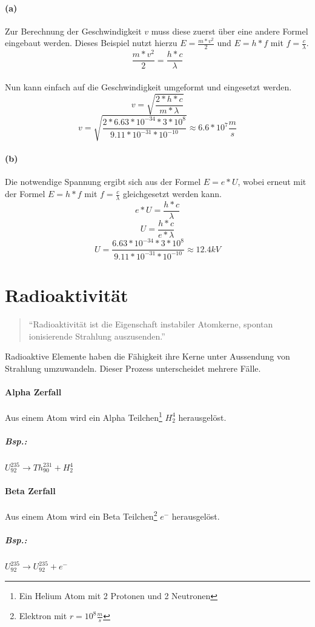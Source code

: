 \documentclass{school}
\begin{document}
\paragraph{(a)}
Zur Berechnung der Geschwindigkeit $v$ muss diese zuerst über eine andere Formel eingebaut werden. Dieses Beispiel nutzt hierzu $E = \frac{m*v^2}{2}$ und $E = h * f$ mit $f = \frac{c}{\lambda}$.
$$\frac{m*v^2}{2} = \frac{h * c}{\lambda}$$
~\\
Nun kann einfach auf die Geschwindigkeit umgeformt und eingesetzt werden.
$$v = \sqrt{\frac{2 * h * c}{m * \lambda}}$$
$$v = \sqrt{\frac{2 * 6.63*10^{-34}*3*10^8}{9.11 * 10^{-31} * 10^{-10}}} \approx 6.6 * 10^7 \frac{m}{s}$$
\paragraph{(b)}
Die notwendige Spannung ergibt sich aus der Formel $E = e * U$, wobei erneut mit der Formel $E = h * f$ mit $f = \frac{c}{\lambda}$ gleichgesetzt werden kann.
$$e * U = \frac{h * c}{\lambda}$$
$$U = \frac{h * c}{e * \lambda}$$
$$U = \frac{6.63 * 10^{-34} * 3 * 10^8}{9.11 * 10^{-31} * 10^{-10}} \approx 12.4 kV$$

\newpage
\section{Radioaktivität}
\begin{quote}
``Radioaktivität ist die Eigenschaft instabiler Atomkerne, spontan ionisierende Strahlung auszusenden.'' \cite{wikipedia-radio}
\end{quote}
Radioaktive Elemente haben die Fähigkeit ihre Kerne unter Aussendung von Strahlung umzuwandeln. Dieser Prozess unterscheidet mehrere Fälle.

\paragraph{Alpha Zerfall}
Aus einem Atom wird ein Alpha Teilchen\footnote{Ein Helium Atom mit 2 Protonen und 2 Neutronen} $H^4_2$ herausgelöst.
\subparagraph{Bsp.:} $U^{235}_{92} \to Th^{231}_{90} + H^4_2$

\paragraph{Beta Zerfall}
Aus einem Atom wird ein Beta Teilchen\footnote{Elektron mit $r=10^8 \frac{m}{s}$} $e^-$ herausgelöst.
\subparagraph{Bsp.:} $U^{235}_{92} \to U^{235}_{92} + e^-$
\end{document}
